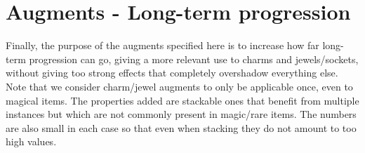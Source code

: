 \documentclass[12pt,a4paper]{article}
\begin{document}
\begin{center}
\end{center}
\section{Augments - Long-term progression}

Finally, the purpose of the augments specified here is to increase how far long-term progression can go, giving a more relevant use to charms and jewels/sockets, without giving too strong effects that completely overshadow everything else. Note that we consider charm/jewel augments to only be applicable once, even to magical items. The properties added are stackable ones that benefit from multiple instances but which are not commonly present in magic/rare items. The numbers are also small in each case so that even when stacking they do not amount to too high values.
\end{document}
